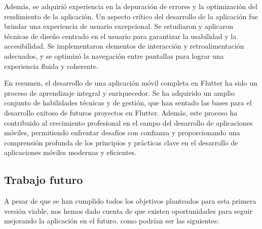 \documentclass{article}
\begin{document}
Además, se adquirió experiencia en la depuración de errores y la optimización del rendimiento de la aplicación. Un aspecto crítico del desarrollo de la aplicación fue brindar una experiencia de usuario excepcional. Se estudiaron y aplicaron técnicas de diseño centrado en el usuario para garantizar la usabilidad y la accesibilidad. Se implementaron elementos de interacción y retroalimentación adecuados, y se optimizó la navegación entre pantallas para lograr una experiencia fluida y coherente.

En resumen, el desarrollo de una aplicación móvil completa en Flutter ha sido un proceso de aprendizaje integral y enriquecedor. Se ha adquirido un amplio conjunto de habilidades técnicas y de gestión, que han sentado las bases para el desarrollo exitoso de futuros proyectos en Flutter. Además, este proceso ha contribuido al crecimiento profesional en el campo del desarrollo de aplicaciones móviles, permitiendo enfrentar desafíos con confianza y proporcionando una comprensión profunda de los principios y prácticas clave en el desarrollo de aplicaciones móviles modernas y eficientes.

\subsection{Trabajo futuro}

A pesar de que se han cumplido todos los objetivos planteados para esta primera versión viable, nos hemos dado cuenta de que existen oportunidades para seguir mejorando la aplicación en el futuro, como podrían ser las siguientes:
\end{document}
